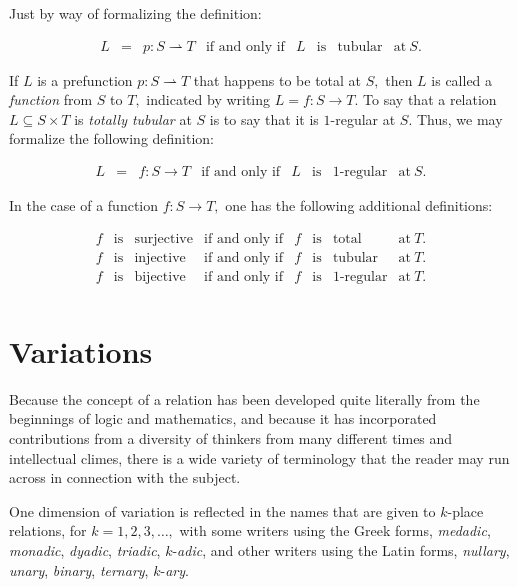 \documentclass[12pt]{article}
\begin{document}
Just by way of formalizing the definition:

\[ \begin{array}{cccccccc}
L & = & p : S \rightharpoonup T & \text{if and only if} & L & \text{is} & \text{tubular} & \text{at}\ S.
\end{array} \]

If $L$ is a prefunction $p : S \rightharpoonup T$ that happens to be total at $S,$ then $L$ is called a \textit{function} from $S$ to $T,$ indicated by writing $L = f : S \to T.$  To say that a relation $L \subseteq S \times T$ is \textit{totally tubular} at $S$ is to say that it is $1$-regular at $S.$  Thus, we may formalize the following definition:

\[ \begin{array}{cccccccc}
L & = & f : S \to T & \text{if and only if} & L & \text{is} & 1\text{-regular} & \text{at}\ S.
\end{array} \]

In the case of a function $f : S \to T,$ one has the following additional definitions:

\[ \begin{array}{cccccccc}
f & \text{is} & \text{surjective} & \text{if and only if} & f & \text{is} & \text{total}  & \text{at}\ T. \\
f & \text{is} & \text{injective} & \text{if and only if} & f & \text{is} & \text{tubular} & \text{at}\ T. \\
f & \text{is} & \text{bijective} & \text{if and only if} & f & \text{is} & 1\text{-regular} & \text{at}\ T. \\
\end{array} \]

\section{Variations}

Because the concept of a relation has been developed quite literally from the beginnings of logic and mathematics, and because it has incorporated contributions from a diversity of thinkers from many different times and intellectual climes, there is a wide variety of terminology that the reader may run across in connection with the subject.

One dimension of variation is reflected in the names that are given to $k$-place relations, for $k = 1, 2, 3, \ldots,$ with some writers using the Greek forms, \emph{medadic}, \emph{monadic}, \emph{dyadic}, \emph{triadic}, $k$-\emph{adic}, and other writers using the Latin forms, \emph{nullary}, \emph{unary}, \emph{binary}, \emph{ternary}, $k$-\emph{ary}.
\end{document}
